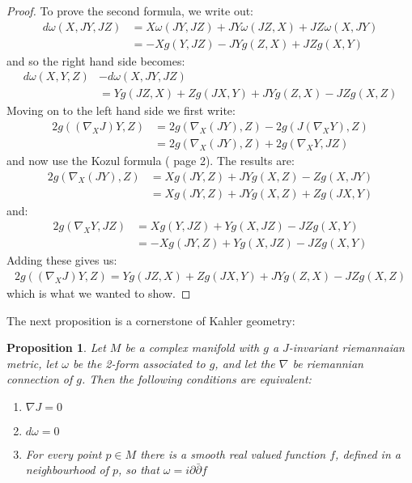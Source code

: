 \documentclass[11pt]{amsart}
\newtheorem{prop}[subsection]{Proposition}
\theoremstyle{definition}
\def \del{ \partial }
\def \delbar{ \bar{\partial} }
\begin{document}
\begin{proof}
To prove the second formula, we write out:
%
\begin{align*}
d \omega( X, JY, JZ ) &= X \omega( JY, JZ ) + JY \omega( JZ, X ) + JZ \omega( X, JY ) \\
&= - X g( Y, JZ ) - JY g( Z, X ) + JZ g( X, Y )
\end{align*}
%
and so the right hand side becomes:
%
\begin{align*}
d \omega( X, Y, Z ) &- d \omega( X, JY, JZ ) \\
&= Y g( JZ, X ) + Z g( JX, Y ) + JY g( Z, X ) - JZ g(X, Z)
\end{align*}
%
Moving on to the left hand side we first write:
%
\begin{align*}
2 g( (\nabla_X J)Y, Z ) &= 2 g( \nabla_X (JY), Z ) - 2 g( J( \nabla_X Y ), Z ) \\
&= 2 g( \nabla_X (JY), Z ) + 2 g( \nabla_X Y, JZ )
\end{align*}
%
and now use the Kozul formula (\cite{CE} page 2).  The results are:
%
\begin{align*}
2 g( \nabla_X (JY), Z ) &= X g( JY, Z ) + JY g( X, Z ) - Z g( X, JY ) \\
&= X g( JY, Z ) + JY g( X, Z ) + Z g( JX, Y ) 
\end{align*}
%
and:
%
\begin{align*}
2 g( \nabla_X Y, JZ ) &= X g( Y, JZ ) + Y g( X, JZ ) - JZ g( X, Y ) \\
&=  - X g( JY, Z ) + Y g( X, JZ ) - JZ g( X, Y )
\end{align*}
%
Adding these gives us:
%
\begin{align*}
2 g( (\nabla_X J)Y, Z ) = Y g( JZ, X ) + Z g( JX, Y ) + JY g( Z, X ) - JZ g(X, Z)
\end{align*}
%
which is what we wanted to show.
%
\end{proof}
%
The next proposition is a cornerstone of Kahler geometry:
%
\begin{prop} Let $M$ be a complex manifold with $g$ a $J$-invariant riemannaian metric, let $\omega$ be the 2-form associated to $g$, and let the $\nabla$ be riemannian connection of $g$.  Then the following conditions are equivalent:
%
\begin{enumerate}
%
\item $ \nabla J = 0 $
%
\item $ d \omega = 0 $
%
\item For every point $p \in M$ there is a smooth real valued function $f$, defined in a neighbourhood of $p$, so that $ \omega = i \del \delbar f$
%
\end{enumerate}
%
\end{prop}
\end{document}
